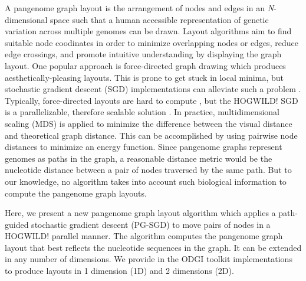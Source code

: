 \documentclass{bioinfo}
\theoremstyle{definition}
\newcommand{\red}[1]{{\textcolor{Red}{#1}}}
\newcommand{\FIXME}[1]{\red{[FIXME: #1]}}
\begin{document}
	A pangenome graph layout is the arrangement of nodes and edges in an \textit{N}-dimensional space such that a human accessible representation of genetic variation across multiple genomes can be drawn. 
	Layout algorithms aim to find suitable node coodinates in order to minimize overlapping nodes or edges, reduce edge crossings, and promote intuitive understanding by displaying the graph layout.
	One popular approach is force-directed graph drawing \citep{cheong_force-directed_2022} which produces aesthetically-pleasing layouts.
	This is prone to get stuck in local minima, but stochastic gradient descent (SGD) implementations can alleviate such a problem \citep{Zheng2019}.
	Typically, force-directed layouts are hard to compute \citep{wang_research_2014}, but the HOGWILD! SGD is a parallelizable, therefore scalable solution \citep{Recht2011}.
	In practice, multidimensional scaling (MDS) is applied to minimize the difference between the visual distance and theoretical graph distance. This can be accomplished by using pairwise node	 distances to minimize an energy function.
	Since pangenome graphs represent genomes as paths in the graph, a reasonable distance metric would be the nucleotide distance between a pair of nodes traversed by the same path.
	But to our knowledge, no algorithm takes into account such biological information to compute the pangenome graph layouts.
	
	Here, we present a new pangenome graph layout algorithm which applies a path-guided stochastic gradient descent (PG-SGD) to move pairs of nodes in a HOGWILD! parallel manner.
	The algorithm computes the pangenome graph layout that best reflects the nucleotide sequences in the graph.
	It can be extended in any number of dimensions. We provide in the ODGI toolkit \citep{Guarracino2022} implementations to produce layouts in 1 dimension (1D) and 2 dimensions (2D).
\end{document}
